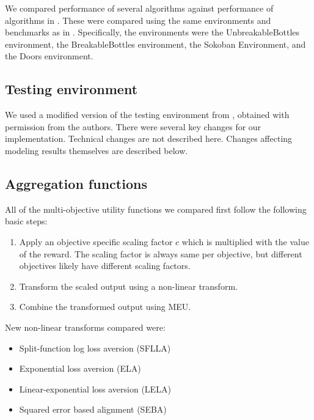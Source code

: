 We compared performance of several algorithms against performance of algorithms in \cite{vamplew_potential-based_2021}. These were compared using the same environments and benchmarks as in \cite{vamplew_potential-based_2021}. Specifically, the environments were the UnbreakableBottles environment, the BreakableBottles environment, the Sokoban Environment, and the Doors environment.
\subsection{Testing environment}

We used a modified version of the testing environment from \cite{vamplew_potential-based_2021}, obtained with permission from the authors. There were several key changes for our implementation. Technical changes are not described here. Changes affecting modeling results themselves are described below.



\subsection{Aggregation functions}

All of the multi-objective utility functions we compared first follow the following basic steps:
\begin{enumerate}

    \item Apply an objective specific scaling factor $c$ which is multiplied with the value of the reward. The scaling factor is always same per objective, but different objectives likely have different scaling factors.
    \item Transform the scaled output using a non-linear transform. %
    \item Combine the transformed output using MEU.
\end{enumerate}

 New non-linear transforms compared were:

\begin{itemize}
    \item Split-function log loss aversion (SFLLA)
    \item Exponential loss aversion (ELA)
    \item Linear-exponential loss aversion (LELA)
    \item Squared error based alignment (SEBA)
\end{itemize}

